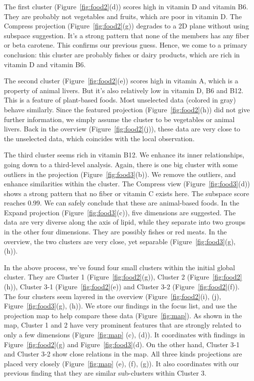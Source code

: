 The first cluster (Figure~\ref{fig:food2}(d)) scores high in vitamin D and vitamin B6. They are probably not vegetables and fruits, which are poor in vitamin D. The Compress projection (Figure~\ref{fig:food2}(g)) degrades to a 2D plane without using subspace suggestion. It's a strong pattern that none of the members has any fiber or beta carotene. This confirms our previous guess. Hence, we come to a primary conclusion: this cluster are probably fishes or dairy products, which are rich in vitamin D and vitamin B6.

The second cluster (Figure~\ref{fig:food2}(e)) scores high in vitamin A, which is a property of animal livers. But it's also relatively low in vitamin D, B6 and B12. This is a feature of plant-based foods. Most unselected data (colored in gray) behave similarly. Since the featured projection (Figure~\ref{fig:food2}(h)) did not give further information, we simply assume the cluster to be vegetables or animal livers. Back in the overview (Figure~\ref{fig:food2}(j)), these data are very close to the unselected data, which coincides with the local observation.

The third cluster seems rich in vitamin B12. We enhance its inner relationships, going down to a third-level analysis. Again, there is one big cluster with some outliers in the projection (Figure~\ref{fig:food3}(b)). We remove the outliers, and enhance similarities within the cluster. The Compress view (Figure~\ref{fig:food3}(d)) shows a strong pattern that no fiber or vitamin C exists here. The subspace score reaches 0.99. We can safely conclude that these are animal-based foods. In the Expand projection (Figure~\ref{fig:food3}(c)), five dimensions are suggested. The data are very diverse along the axis of lipid, while they separate into two groups in the other four dimensions. They are possibly fishes or red meats. In the overview, the two clusters are very close, yet separable (Figure~\ref{fig:food3}(g), (h)).

In the above process, we've found four small clusters within the initial global cluster. They are Cluster 1 (Figure~\ref{fig:food2}(g)), Cluster 2 (Figure~\ref{fig:food2}(h)), Cluster 3-1 (Figure~\ref{fig:food2}(e)) and Cluster 3-2 (Figure~\ref{fig:food2}(f)). The four clusters seem layered in the overview (Figure~\ref{fig:food2}(i), (j), Figure~\ref{fig:food3}(g), (h)). We store our findings in the focus list, and use the projection map to help compare these data (Figure~\ref{fig:map}). As shown in the map, Cluster 1 and 2 have very prominent features that are strongly related to only a few dimensions (Figure~\ref{fig:map} (c), (d)). It coordinates with findings in Figure~\ref{fig:food2}(g) and Figure~\ref{fig:food3}(d). On the other hand, Cluster 3-1 and Cluster 3-2 show close relations in the map. All three kinds projections are placed very closely (Figure~\ref{fig:map} (e), (f), (g)). It also coordinates with our previous finding that they are similar sub-clusters within Cluster 3.

